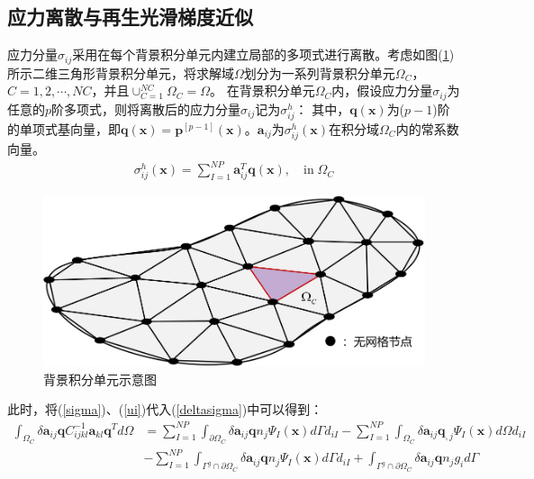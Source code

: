 \subsection{应力离散与再生光滑梯度近似}
应力分量$\sigma_{ij}$采用在每个背景积分单元内建立局部的多项式进行离散。考虑如图(\ref{background})所示二维三角形背景积分单元，将求解域$\Omega$划分为一系列背景积分单元$\Omega_C$，$C=1,2,\dotsb,N\!C$，并且$\cup_{C=1}^{N\!C}\Omega_C=\Omega$。
在背景积分单元$\Omega_C$内，假设应力分量$\sigma_{ij}$为任意的$p$阶多项式，则将离散后的应力分量$\sigma_{ij}$记为$\sigma^h_{ij}$：
其中，$\pmb{q}(\pmb{x})$为($p-1$)阶的单项式基向量，即$\pmb{q}(\pmb{x})=\pmb{p}^{[p-1]}(\pmb{x})$。$\pmb{a}_{ij}$为$\sigma_{ij}^h(\pmb{x})$在积分域$\Omega_C$内的常系数向量。\\
\begin{equation}\label{sigma}
\begin{split}
    \sigma^h_{ij}(\pmb{x})=\sum_{I=1}^{N\!P}\pmb{a}_{ij}^T\pmb{q}(\pmb{x}),\quad\text{in}\;\Omega_C
\end{split}
\end{equation}
\begin{figure}[!h]
    \centering
    \includegraphics[scale=0.7]{figure/background.png}
    \caption{背景积分单元示意图}\label{background}
\end{figure}
此时，将(\ref{sigma})、(\ref{ui})代入(\ref{deltasigma})中可以得到：
\begin{equation}
\begin{split}
    \int_{\Omega_C}\delta\pmb{a}_{ij}\pmb{q}C^{-1}_{ijkl}\pmb{a}_{kl}\pmb{q}^Td\Omega&=\sum_{I=1}^{N\!P}\int_{\partial\Omega_C}\delta\pmb{a}_{ij}\pmb{q}n_j\Psi_I(\pmb{x})d\Gamma d_{iI}-\sum_{I=1}^{N\!P}\int_{\Omega_C}\delta\pmb{a}_{ij}\pmb{q}_{,j}\Psi_{I}(\pmb{x})d\Omega d_{iI}\\
     &-\sum_{I=1}^{N\!P}\int_{\Gamma^g\cap\partial\Omega_C}\delta\pmb{a}_{ij}\pmb{q}n_j\Psi_I(\pmb{x})d\Gamma d_{iI}+\int_{\Gamma^g\cap\partial\Omega_C}\delta\pmb{a}_{ij}\pmb{q}n_jg_id\Gamma
\end{split}
\end{equation}
